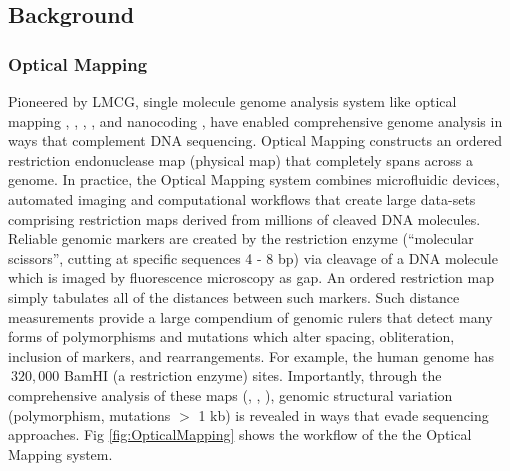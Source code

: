 
\subsection{Background}
\subsubsection*{Optical Mapping}
Pioneered by LMCG, single molecule genome analysis system like optical mapping \cite{Schwartz_etal_1993_Science}, \cite{Dimalanta_etal_2004_AnalChem}, \cite{Aston_etal_1999_Optical}, \cite{Teague_etal_2010_PNAS}, \cite{Yokota_etal_1997_NAR} and nanocoding \cite{Jo_etal_2007_PNAS}, \cite{Chen_etal_2005_Macromolecules} have enabled comprehensive genome analysis in ways that
complement DNA sequencing. Optical Mapping constructs an ordered restriction endonuclease map (physical map) that completely spans across a genome. In practice, the Optical Mapping system combines microfluidic devices, automated imaging and computational workflows that create large data-sets comprising restriction maps derived from millions of cleaved DNA molecules. Reliable genomic markers are created by the restriction enzyme (``molecular scissors'', cutting at specific sequences 4 - 8 bp) via cleavage of a DNA molecule which is imaged by fluorescence microscopy as gap. An ordered restriction map simply tabulates all of the distances between such markers. Such distance measurements provide a large compendium of genomic rulers that detect many forms of polymorphisms and mutations which alter spacing, obliteration, inclusion of markers, and rearrangements. For example, the human genome has $~320,000$ BamHI (a restriction enzyme) sites. Importantly, through the comprehensive analysis of these maps (\cite{Gupta_etal_2015_PNAS}, \cite{Ray_etal_2013_BMCGenomics}, \cite{Teague_etal_2010_PNAS}), genomic structural variation (polymorphism, mutations $>$ 1 kb) is revealed in ways that evade sequencing approaches. Fig \ref{fig:OpticalMapping} shows the workflow of the the Optical Mapping system.


